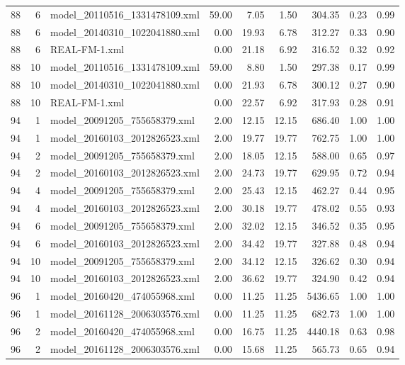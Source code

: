 \begin{table}[ht]
\begin{tabular}{rrlrrrrrr}
   88 &   6 & model\_20110516\_1331478109.xml & 59.00 & 7.05 & 1.50 & 304.35 & 0.23 & 0.99 \\ 
   88 &   6 & model\_20140310\_1022041880.xml & 0.00 & 19.93 & 6.78 & 312.27 & 0.33 & 0.90 \\ 
   88 &   6 & REAL-FM-1.xml & 0.00 & 21.18 & 6.92 & 316.52 & 0.32 & 0.92 \\ 
   88 &  10 & model\_20110516\_1331478109.xml & 59.00 & 8.80 & 1.50 & 297.38 & 0.17 & 0.99 \\ 
   88 &  10 & model\_20140310\_1022041880.xml & 0.00 & 21.93 & 6.78 & 300.12 & 0.27 & 0.90 \\ 
   88 &  10 & REAL-FM-1.xml & 0.00 & 22.57 & 6.92 & 317.93 & 0.28 & 0.91 \\ 
   94 &   1 & model\_20091205\_755658379.xml & 2.00 & 12.15 & 12.15 & 686.40 & 1.00 & 1.00 \\ 
   94 &   1 & model\_20160103\_2012826523.xml & 2.00 & 19.77 & 19.77 & 762.75 & 1.00 & 1.00 \\ 
   94 &   2 & model\_20091205\_755658379.xml & 2.00 & 18.05 & 12.15 & 588.00 & 0.65 & 0.97 \\ 
   94 &   2 & model\_20160103\_2012826523.xml & 2.00 & 24.73 & 19.77 & 629.95 & 0.72 & 0.94 \\ 
   94 &   4 & model\_20091205\_755658379.xml & 2.00 & 25.43 & 12.15 & 462.27 & 0.44 & 0.95 \\ 
   94 &   4 & model\_20160103\_2012826523.xml & 2.00 & 30.18 & 19.77 & 478.02 & 0.55 & 0.93 \\ 
   94 &   6 & model\_20091205\_755658379.xml & 2.00 & 32.02 & 12.15 & 346.52 & 0.35 & 0.95 \\ 
   94 &   6 & model\_20160103\_2012826523.xml & 2.00 & 34.42 & 19.77 & 327.88 & 0.48 & 0.94 \\ 
   94 &  10 & model\_20091205\_755658379.xml & 2.00 & 34.12 & 12.15 & 326.62 & 0.30 & 0.94 \\ 
   94 &  10 & model\_20160103\_2012826523.xml & 2.00 & 36.62 & 19.77 & 324.90 & 0.42 & 0.94 \\ 
   96 &   1 & model\_20160420\_474055968.xml & 0.00 & 11.25 & 11.25 & 5436.65 & 1.00 & 1.00 \\ 
   96 &   1 & model\_20161128\_2006303576.xml & 0.00 & 11.25 & 11.25 & 682.73 & 1.00 & 1.00 \\ 
   96 &   2 & model\_20160420\_474055968.xml & 0.00 & 16.75 & 11.25 & 4440.18 & 0.63 & 0.98 \\ 
   96 &   2 & model\_20161128\_2006303576.xml & 0.00 & 15.68 & 11.25 & 565.73 & 0.65 & 0.94 \\ 

\end{tabular}
\end{table}
